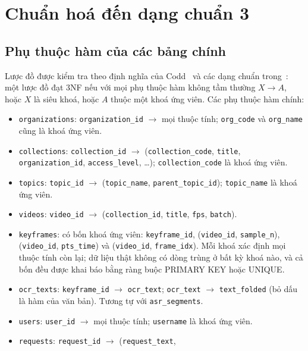 \section{Chuẩn hoá đến dạng chuẩn 3}

\subsection{Phụ thuộc hàm của các bảng chính}

Lược đồ được kiểm tra theo định nghĩa của Codd~\cite{codd1970relational} và các dạng chuẩn
trong~\cite{elmasri2016fundamentals}: một lược đồ đạt 3NF nếu với mọi phụ thuộc hàm không
tầm thường $X \rightarrow A$, hoặc $X$ là siêu khoá, hoặc $A$ thuộc một khoá ứng viên.
Các phụ thuộc hàm chính:
\begin{itemize}
    \item \texttt{organizations}: \texttt{organization\_id} $\rightarrow$ mọi thuộc tính;
    \texttt{org\_code} và \texttt{org\_name} cũng là khoá ứng viên.
    \item \texttt{collections}: \texttt{collection\_id} $\rightarrow$ (\texttt{collection\_code},
    \texttt{title}, \texttt{organization\_id}, \texttt{access\_level}, \dots);
    \texttt{collection\_code} là khoá ứng viên.
    \item \texttt{topics}: \texttt{topic\_id} $\rightarrow$ (\texttt{topic\_name},
    \texttt{parent\_topic\_id}); \texttt{topic\_name} là khoá ứng viên.
    \item \texttt{videos}: \texttt{video\_id} $\rightarrow$ (\texttt{collection\_id},
    \texttt{title}, \texttt{fps}, \texttt{batch}).
    \item \texttt{keyframes}: có bốn khoá ứng viên: \texttt{keyframe\_id},
    (\texttt{video\_id}, \texttt{sample\_n}), (\texttt{video\_id}, \texttt{pts\_time}) và
    (\texttt{video\_id}, \texttt{frame\_idx}). Mỗi khoá xác định mọi thuộc tính còn lại; dữ
    liệu thật không có dòng trùng ở bất kỳ khoá nào, và cả bốn đều được khai báo bằng
    ràng buộc PRIMARY KEY hoặc UNIQUE.
    \item \texttt{ocr\_texts}: \texttt{keyframe\_id} $\rightarrow$ \texttt{ocr\_text};
    \texttt{ocr\_text} $\rightarrow$ \texttt{text\_folded} (bỏ dấu là hàm của văn bản).
    Tương tự với \texttt{asr\_segments}.
    \item \texttt{users}: \texttt{user\_id} $\rightarrow$ mọi thuộc tính;
    \texttt{username} là khoá ứng viên.
    \item \texttt{requests}: \texttt{request\_id} $\rightarrow$ (\texttt{request\_text},

\end{itemize}
